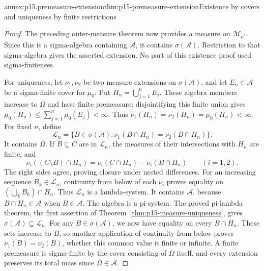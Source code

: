 \begin{annexitem}{annex:p15.premeasure-extension}{thm:p15-premeasure-extension}{Existence by covers and uniqueness by finite restrictions}
\begin{proof}
The preceding outer-measure theorem now provides a measure on
\(\mathcal M_{\mu^*}\). Since this is a sigma-algebra containing
\(\mathcal A\), it contains \(\sigma(\mathcal A)\). Restriction
to that sigma-algebra gives the asserted extension. No part of this
existence proof used sigma-finiteness.

For uniqueness, let \(\nu_1,\nu_2\) be two measure extensions on
\(\sigma(\mathcal A)\), and let \(E_n\in\mathcal A\) be a
sigma-finite cover for \(\mu_0\). Put
\(H_n=\bigcup_{j=1}^n E_j\). These algebra members increase to
\(\Omega\) and have finite premeasure: disjointifying this finite
union gives \(\mu_0(H_n)\leq\sum_{j=1}^n\mu_0(E_j)<\infty\).
Thus \(\nu_1(H_n)=\nu_2(H_n)=\mu_0(H_n)<\infty\).
For fixed \(n\), define
\[
 \mathcal L_n=\{B\in\sigma(\mathcal A):
                  \nu_1(B\cap H_n)=\nu_2(B\cap H_n)\}.
\]
It contains \(\Omega\). If \(B\subseteq C\) are in
\(\mathcal L_n\), the measures of their intersections with \(H_n\)
are finite, and
\[
 \nu_i((C\setminus B)\cap H_n)
     =\nu_i(C\cap H_n)-\nu_i(B\cap H_n)
                  \qquad(i=1,2).
\]
The right sides agree, proving closure under nested differences.
For an increasing sequence \(B_k\in\mathcal L_n\), continuity
from below of each \(\nu_i\) proves equality on
\((\bigcup_k B_k)\cap H_n\). Thus \(\mathcal L_n\) is a
lambda-system. It contains \(\mathcal A\), because
\(B\cap H_n\in\mathcal A\) when \(B\in\mathcal A\).
The algebra is a pi-system. The proved pi-lambda theorem, the first
assertion of Theorem~\ref{thm:p15-measure-uniqueness}, gives
\(\sigma(\mathcal A)\subseteq\mathcal L_n\).
For any \(B\in\sigma(\mathcal A)\), we now have equality on
every \(B\cap H_n\). These sets increase to \(B\), so another
application of continuity from below proves \(\nu_1(B)=\nu_2(B)\),
whether this common value is finite or infinite. A finite premeasure
is sigma-finite by the cover consisting of \(\Omega\) itself, and
every extension preserves its total mass since \(\Omega\in\mathcal A\).
\end{proof}
\end{annexitem}

